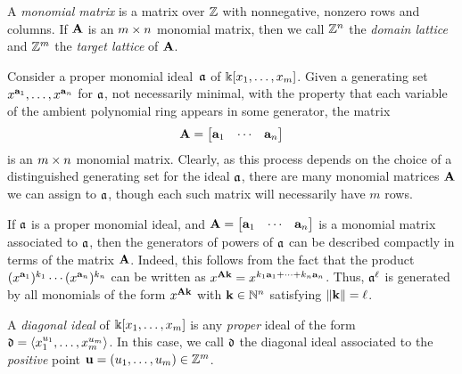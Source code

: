 \documentclass{amsart}
\begin{document}
\begin{definition}
\label{monomial matrix: D}
A \emph{monomial matrix} is a matrix over $\mathbb{Z}$ with nonnegative, nonzero rows and columns.
If $\mathbf{A}$ is an $m \times n$ monomial matrix, then we call $\mathbb{Z}^n$ the \emph{domain lattice} and $\mathbb{Z}^m$ the \emph{target lattice} of $\mathbf{A}$.
\end{definition}

\begin{remark}
   \label{monomial matrix ideal: R}
   Consider a proper monomial ideal~$\mathfrak{a}$ of $\Bbbk[x_1, \ldots, x_{m}]$.
   Given a generating set $x^{\mathbf{a}_1}, \ldots, x^{\mathbf{a}_n}$ for $\mathfrak{a}$, not necessarily minimal, with the property that each variable of the ambient polynomial ring appears in some generator, the matrix
   \[
      \mathbf{A}= \begin{bmatrix} \mathbf{a}_1 & \cdots & \mathbf{a}_n \end{bmatrix}
   \]
   is an  $m \times n$ monomial matrix.
   Clearly, as this process depends on the choice of a distinguished generating set for the ideal $\mathfrak{a}$, there are many monomial matrices $\mathbf{A}$ we can assign to $\mathfrak{a}$, though each such matrix will necessarily have $m$ rows.
\end{remark}

\begin{remark}
   \label{generators-via-exponent-matrix: R}
   If $\mathfrak{a}$ is a proper monomial ideal, and $\mathbf{A}= \begin{bmatrix} \mathbf{a}_1 & \cdots & \mathbf{a}_n \end{bmatrix}$ is a monomial matrix associated to $\mathfrak{a}$, then the generators of powers of $\mathfrak{a}$ can be described compactly in terms of the matrix $\mathbf{A}$.
   Indeed, this follows from the fact that the product $(x^{\mathbf{a}_1})^{k_1} \cdots (x^{\mathbf{a}_n})^{k_n}$ can be written as $x^{\mathbf{A} \mathbf{k}} = x^{k_1 \mathbf{a}_1 + \cdots + k_n \mathbf{a}_n}$.
   Thus, $\mathfrak{a}^\ell$ is generated by all monomials of the form $x^{\mathbf{A} \mathbf{k}}$ with $\mathbf{k} \in \mathbb{N}^n$ satisfying $\| \mathbf{k} \| = \ell$.
\end{remark}

\begin{definition}
   A  \emph{diagonal ideal} of $\Bbbk[x_1, \ldots, x_{m}]$ is any \emph{proper} ideal of the form $\mathfrak{d} = \langle x_1^{u_1}, \ldots, x_{m}^{u_{m}} \rangle$.
   In this case,  we call $\mathfrak{d}$ the diagonal ideal associated to the \emph{positive} point $\mathbf{u} = (u_1, \ldots, u_{m}) \in \mathbb{Z}^{m}$.
\end{definition}
\end{document}
